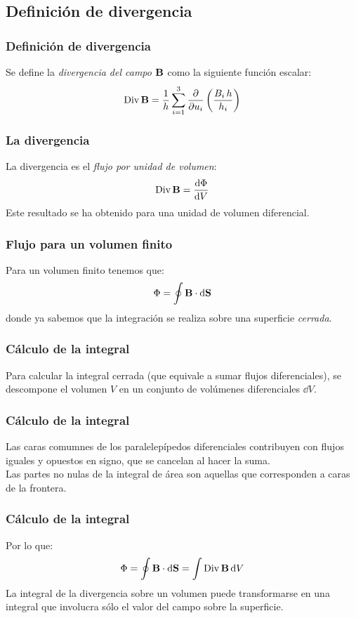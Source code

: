 \documentclass[12pt]{beamer}
\begin{document}
\subsection{Definición de divergencia}
\begin{frame}
\frametitle{Definición de divergencia}
Se define la \emph{divergencia del campo $\vb{B}$} como la siguiente función escalar:
\begin{align}
{\rm Div} \, \vb{B} = \dfrac{1}{h} \sum_{i=1}^{3} \pdv{u_{i}} \left( \dfrac{B_{i} \, h}{h_{i}} \right)
\label{eq:ecuacion_01_30}
\end{align}
\end{frame}
\begin{frame}
\frametitle{La divergencia}
La divergencia es el \emph{flujo por unidad de volumen}:
\begin{align*}
{\rm Div} \, \vb{B} = \dfrac{\dd{\Phi}}{\dd{V}}
\end{align*}
\pause
Este resultado se ha obtenido para una unidad de volumen diferencial.
\end{frame}
\begin{frame}
\frametitle{Flujo para un volumen finito}
Para un volumen finito tenemos que:
\begin{align*}
\Phi = \oint \vb{B} \cdot \dd{\vb{S}}
\end{align*}
donde ya sabemos que la integración se realiza sobre una superficie \emph{cerrada}.
\end{frame}
\begin{frame}
\frametitle{Cálculo de la integral}
Para calcular la integral cerrada (que equivale a sumar flujos diferenciales), se descompone el volumen $V$ en un conjunto de volúmenes diferenciales $\dd{V}$.
\end{frame}
\begin{frame}
\frametitle{Cálculo de la integral}
Las caras comumnes de los paralelepípedos diferenciales contribuyen con flujos iguales y opuestos en signo, que se cancelan al hacer la suma.
\\
\bigskip
\pause
Las partes no nulas de la integral de área son aquellas que corresponden a caras de la frontera.
\end{frame}
\begin{frame}
\frametitle{Cálculo de la integral}
Por lo que:
\begin{align*}
\Phi = \oint \vb{B} \cdot \dd{\vb{S}} = \int {\rm Div} \, \vb{B} \dd{V}
\end{align*}
\pause
La integral de la divergencia sobre un volumen puede transformarse en una integral que involucra sólo el valor del campo sobre la superficie.
\end{frame}
\end{document}
